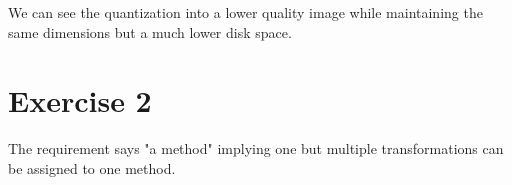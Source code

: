 \documentclass[12pt, a4paper]{article}
\begin{document}
\begin{multicols}{2}

    \begin{table}[H]
        \caption{Comparison of Images}\label{tab:comp}
        \begin{center}
        \end{center}
    \end{table}

    We can see the quantization into a lower quality image while maintaining the same dimensions but a much lower disk space.
    \newline

    \section{Exercise 2} \label{sec:ex2}

    The requirement says "a method" implying one but multiple transformations can be assigned to one method.
    \newline

    \begin{table}[H]
        \caption{Method Proposals}\label{tab:proposals}
        \begin{center}
        \end{center}
    \end{table}



\end{multicols}
\end{document}
